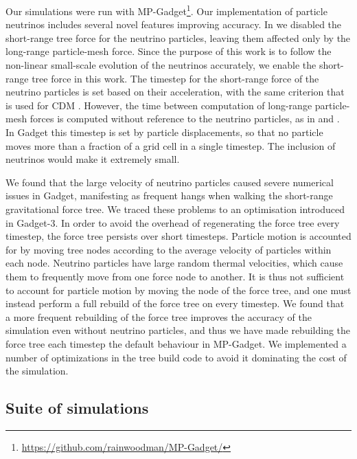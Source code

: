 \documentclass[useAMS, usenatbib]{mnras}
\begin{document}
Our simulations were run with MP-Gadget\footnote{\url{https://github.com/rainwoodman/MP-Gadget/}}. Our implementation of particle neutrinos includes several novel features improving accuracy.
In \cite{Bird_2012} we disabled the short-range tree force for the neutrino particles, leaving them affected only by the long-range particle-mesh force. Since the purpose of this work is to follow the non-linear small-scale evolution of the neutrinos accurately, we enable the short-range tree force in this work. The timestep for the short-range force of the neutrino particles is set based on their acceleration, with the same criterion that is used for CDM \citep{Springel_2005}. However, the time between computation of long-range particle-mesh forces is computed without reference to the neutrino particles, as in \cite{Viel_2010} and \cite{Bird_2012}. In Gadget this timestep is set by particle displacements, so that no particle moves more than a fraction of a grid cell in a single timestep. The inclusion of neutrinos would make it extremely small.

We found that the large velocity of neutrino particles caused severe numerical issues in Gadget, manifesting as frequent hangs when walking the short-range gravitational force tree. We traced these problems to an optimisation introduced in Gadget-3. In order to avoid the overhead of regenerating the force tree every timestep, the force tree persists over short timesteps. Particle motion is accounted for by moving tree nodes according to the average velocity of particles within each node. Neutrino particles have large random thermal velocities, which cause them to frequently move from one force node to another. It is thus not sufficient to account for particle motion by moving the node of the force tree, and one must instead perform a full rebuild of the force tree on every timestep. We found that a more frequent rebuilding of the force tree improves the accuracy of the simulation even without neutrino particles, and thus we have made rebuilding the force tree each timestep the default behaviour in MP-Gadget. We implemented a number of optimizations in the tree build code to avoid it dominating the cost of the simulation.

\subsection{Suite of simulations}
\end{document}
